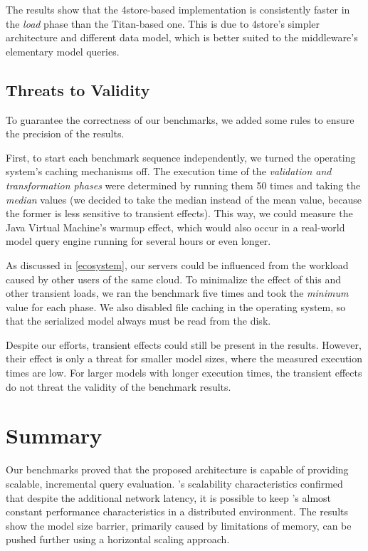 The results show that the 4store-based \iqd{} implementation is consistently faster in the \emph{load} phase than the Titan-based one. This is due to 4store's simpler architecture and different data model, which is better suited to the \iqd{} middleware's elementary model queries.

\subsection{Threats to Validity}
\label{threats-to-validity}

To guarantee the correctness of our benchmarks, we added some rules to ensure the precision of the results.

First, to start each benchmark sequence independently, we turned the operating system's caching mechanisms off. The execution time of the \emph{validation and transformation phases} were determined by running them 50 times and taking the \emph{median} values (we decided to take the median instead of the mean value, because the former is less sensitive to transient effects). This way, we could measure the Java Virtual Machine's warmup effect, which would also occur in a real-world model query engine running for several hours or even longer.

As discussed in \autoref{ecosystem}, our servers could be influenced from the workload caused by other users of the same cloud. To minimalize the effect of this and other transient loads, we ran the benchmark five times and took the \emph{minimum} value for each phase. We also disabled file caching in the operating system, so that the serialized model always must be read from the disk.

Despite our efforts, transient effects could still be present in the results. However, their effect is only a threat for smaller model sizes, where the measured execution times are low. For larger models with longer execution times, the transient effects do not threat the validity of the benchmark results.


\section{Summary}

Our benchmarks proved that the proposed architecture is capable of providing scalable, incremental query evaluation.
\iqd{}'s scalability characteristics confirmed that despite the additional network latency, it is possible to keep \eiq{}'s almost constant performance characteristics in a distributed environment. The results show the model size barrier, primarily caused by limitations of memory, 
can be pushed further using a horizontal scaling approach.

